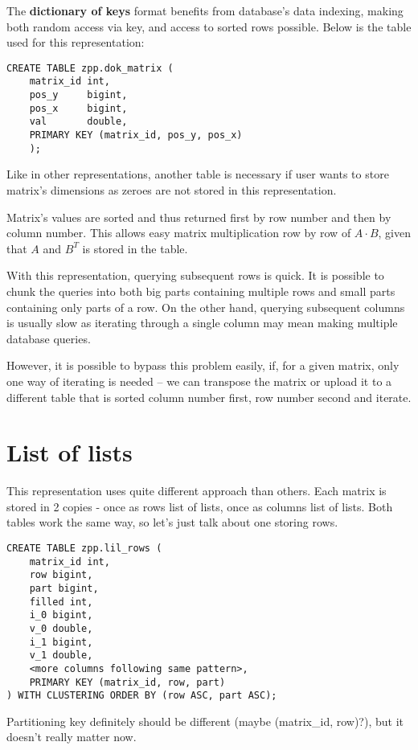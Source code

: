 \documentclass{article}
\begin{document}
The \textbf{dictionary of keys} format benefits from database's data indexing, making both random access via key, and access to sorted rows possible. Below is the table used for this representation:

\begin{lstlisting}[style=SQLStyle]
    CREATE TABLE zpp.dok_matrix (
    matrix_id int,
    pos_y     bigint,
    pos_x     bigint,
    val       double,
    PRIMARY KEY (matrix_id, pos_y, pos_x)
    );
\end{lstlisting}

Like in other representations, another table is necessary if user wants to store matrix's dimensions as zeroes are not stored in this representation.

Matrix's values are sorted and thus returned first by row number and then by column number. This allows easy matrix multiplication row by row of $A \cdot B$, given that $A$ and $B^T$ is stored in the table.

With this representation, querying subsequent rows is quick. It is possible to chunk the queries into both big parts containing multiple rows and small parts containing only parts of a row. On the other hand, querying subsequent columns is usually slow as iterating through a single column may mean making multiple database queries.

However, it is possible to bypass this problem easily, if, for a given matrix, only one way of iterating is needed -- we can transpose the matrix or upload it to a different table that is sorted column number first, row number second and iterate.

\pagebreak
\section{List of lists}

This representation uses quite different approach than others. Each matrix is stored in 2 copies - once as rows list of lists, once as columns list of lists. Both tables work the same way, so let's just talk about one storing rows.

\begin{lstlisting}[style=SQLStyle]
 CREATE TABLE zpp.lil_rows (
    matrix_id int,
    row bigint,
    part bigint,
    filled int,
    i_0 bigint,
    v_0 double,
    i_1 bigint,
    v_1 double,
    <more columns following same pattern>,
    PRIMARY KEY (matrix_id, row, part)
) WITH CLUSTERING ORDER BY (row ASC, part ASC);
\end{lstlisting}
Partitioning key definitely should be different (maybe (matrix\_id, row)?), but it doesn't really matter now.
\end{document}
